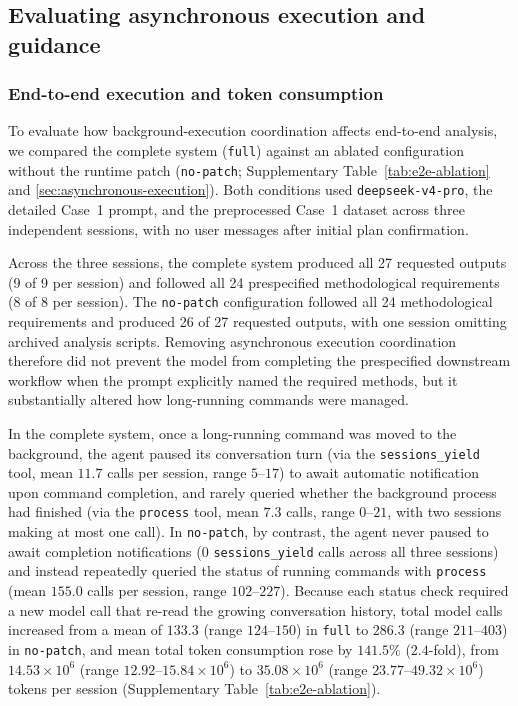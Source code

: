 \documentclass[10pt,letterpaper]{article}
\begin{document}
\FloatBarrier

\subsection{Evaluating asynchronous execution and guidance}
\label{sec:ablation}

\subsubsection{End-to-end execution and token consumption}

To evaluate how background-execution coordination affects end-to-end
analysis, we compared the complete system (\texttt{full}) against an ablated
configuration without the runtime patch (\texttt{no-patch};
Supplementary Table~\ref{tab:e2e-ablation} and \cref{sec:asynchronous-execution}).  Both conditions used
\texttt{deepseek-v4-pro}, the detailed Case~1 prompt, and the preprocessed
Case~1 dataset across three independent sessions, with no user messages after
initial plan confirmation.

Across the three sessions, the complete system produced all 27 requested
outputs (9 of 9 per session) and followed all 24 prespecified methodological
requirements (8 of 8 per session).  The \texttt{no-patch} configuration
followed all 24 methodological requirements and produced 26 of 27 requested
outputs, with one session omitting archived analysis scripts.  Removing
asynchronous execution coordination therefore did not prevent the model from
completing the prespecified downstream workflow when the prompt explicitly
named the required methods, but it substantially altered how long-running
commands were managed.

In the complete system, once a long-running command was moved to the
background, the agent paused its conversation turn (via the
\texttt{sessions\_yield} tool, mean $11.7$ calls per session, range
$5\text{--}17$) to await automatic notification upon command completion, and
rarely queried whether the background process had finished (via the
\texttt{process} tool, mean $7.3$ calls, range $0\text{--}21$, with two
sessions making at most one call).  In \texttt{no-patch}, by contrast, the
agent never paused to await completion notifications ($0$
\texttt{sessions\_yield} calls across all three sessions) and instead
repeatedly queried the status of running commands with \texttt{process} (mean
$155.0$ calls per session, range $102\text{--}227$).  Because each status
check required a new model call that re-read the growing conversation history,
total model calls increased from a mean of $133.3$ (range $124\text{--}150$)
in \texttt{full} to $286.3$ (range $211\text{--}403$) in \texttt{no-patch},
and mean total token consumption rose by $141.5\%$ ($2.4$-fold), from
$14.53 \times 10^6$ (range $12.92\text{--}15.84 \times 10^6$) to
$35.08 \times 10^6$ (range $23.77\text{--}49.32 \times 10^6$) tokens per
session (Supplementary Table~\ref{tab:e2e-ablation}).
\end{document}
